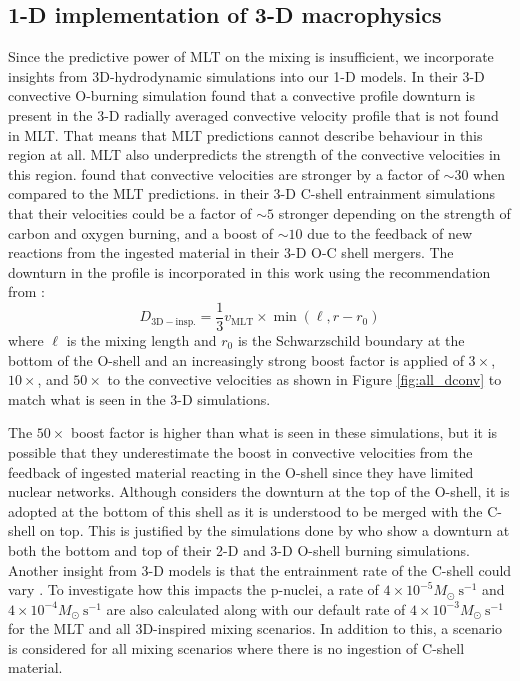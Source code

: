 \subsection{1-D implementation of 3-D macrophysics}\label{sec:mixing_methods}

Since the predictive power of MLT on the mixing is insufficient, we incorporate insights from 3D-hydrodynamic simulations into our 1-D models. 
In their 3-D convective O-burning simulation \cite{jonesIdealizedHydrodynamicSimulations2017} found that a convective profile downturn is present in the 3-D radially averaged convective velocity profile that is not found in MLT.
That means that MLT predictions cannot describe behaviour in this region at all.
MLT also underpredicts the strength of the convective velocities in this region.
\cite{jonesIdealizedHydrodynamicSimulations2017} found that convective velocities are stronger by a factor of $\sim 30$ when compared to the MLT predictions. 
\cite{andrassy3DHydrodynamicSimulations2020} in their 3-D C-shell entrainment simulations that their velocities could be a factor of $\sim 5$ stronger depending on the strength of carbon and oxygen burning, and \cite{rizzutiShellMergersLate2024a} a boost of $\sim 10$ due to the feedback of new reactions from the ingested material in their 3-D O-C shell mergers. 
The downturn in the profile is incorporated in this work using the recommendation from \cite{jonesIdealizedHydrodynamicSimulations2017}:
\begin{equation}
    D_{\mathrm{3D-insp.}} = \frac{1}{3} v_{\mathrm{MLT}}\times\min{(\ell,r-r_0)}
\end{equation} 
where $\ell$ is the mixing length and $r_0$ is the Schwarzschild boundary at the bottom of the O-shell and an increasingly strong boost factor is applied of $3\times$, $10\times$, and $50\times$ to the convective velocities as shown in Figure \ref{fig:all_dconv} to match what is seen in the 3-D simulations.

The $50\times$ boost factor is higher than what is seen in these simulations, but it is possible that they underestimate the boost in convective velocities from the feedback of ingested material reacting in the O-shell since they have limited nuclear networks.
Although \cite{jonesIdealizedHydrodynamicSimulations2017} considers the downturn at the top of the O-shell, it is adopted at the bottom of this shell as it is understood to be merged with the C-shell on top.
This is justified by the simulations done by \cite{meakinTurbulentConvectionStellar2007} who show a downturn at both the bottom and top of their 2-D and 3-D O-shell burning simulations.
Another insight from 3-D models is that the entrainment rate of the C-shell could vary \citep{andrassy3DHydrodynamicSimulations2020}. 
To investigate how this impacts the p-nuclei, a rate of $4\times10^{-5}M_\odot~\mathrm{s^{-1}}$ and $4\times10^{-4}M_\odot~\mathrm{s^{-1}}$ are also calculated along with our default rate of $4\times10^{-3}M_\odot~\mathrm{s^{-1}}$ for the MLT and all 3D-inspired mixing scenarios. 
In addition to this, a scenario is considered for all mixing scenarios where there is no ingestion of C-shell material.

